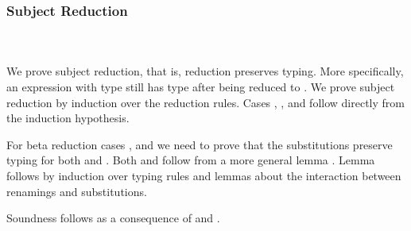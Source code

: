 \subsubsection{Subject Reduction}\hfill\\\\
We prove subject reduction, that is, reduction preserves typing. More specifically, an expression  with type  still has type  after being reduced to . We prove subject reduction by induction over the reduction rules. 
\FSubjectReduction
Cases , ,  and  follow directly from the induction hypothesis. 

\noindent For beta reduction cases ,  and  we need to prove that the substitutions preserve typing for both  \Data{[}  \Data{]} and  \Data{[}  \Data{]}.
Both  and  follow from a more general lemma . 
\Fpreserves
Lemma  follows by induction over typing rules and lemmas about the interaction between renamings and substitutions. 

\noindent Soundness follows as a consequence of  and . 